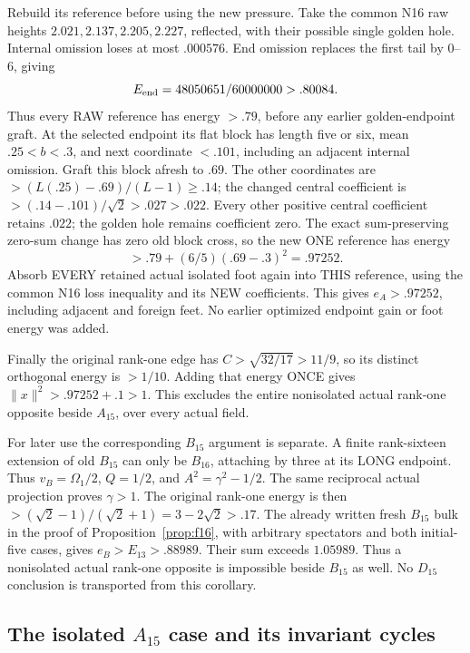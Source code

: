 \documentclass[11pt]{article}
\begin{document}
Rebuild its reference before using the new pressure.
Take the common N16 raw heights
\(2.021,2.137,2.205,2.227\), reflected,
with their possible single golden hole.
Internal omission loses at most \(.000576\).
End omission replaces the first tail by \(0\)--\(6\), giving
\[
                         E_{\rm end}=48050651/60000000>.80084 .
\]
Thus every RAW reference has energy \(>.79\), before any
earlier golden-endpoint graft.
At the selected endpoint its flat block has length five or six,
mean \(.25<b<.3\), and next coordinate \(<.101\), including
an adjacent internal omission.
Graft this block afresh to \(.69\).
The other coordinates are \(>(L(.25)-.69)/(L-1)\ge.14\);
the changed central coefficient is
\(>(.14-.101)/\sqrt2>.027>.022\).
Every other positive central coefficient retains \(.022\);
the golden hole remains coefficient zero.
The exact sum-preserving zero-sum change has zero old block cross,
so the new ONE reference has energy
\[
                    >.79+(6/5)(.69-.3)^2=.97252 .
\]
Absorb EVERY retained actual isolated foot again into THIS
reference, using the common N16 loss inequality and its NEW
coefficients.
This gives \(e_A>.97252\), including adjacent and foreign feet.
No earlier optimized endpoint gain or foot energy was added.

Finally the original rank-one edge has
\(C>\sqrt{32/17}>11/9\), so its distinct orthogonal energy is
\(>1/10\).
Adding that energy ONCE gives
\(\|x\|^2>.97252+.1>1\).
This excludes the entire nonisolated actual rank-one opposite
beside \(A_{15}\), over every actual field.

For later use the corresponding \(B_{15}\) argument is separate.
A finite rank-sixteen extension of old \(B_{15}\) can only be
\(B_{16}\), attaching by three at its LONG endpoint.
Thus \(v_B=\Omega_1/2\), \(Q=1/2\), and
\(A^2=\gamma^2-1/2\).
The same reciprocal actual projection proves \(\gamma>1\).
The original rank-one energy is then
\(>(\sqrt2-1)/(\sqrt2+1)=3-2\sqrt2>.17\).
The already written fresh \(B_{15}\) bulk in the proof of
Proposition~\ref{prop:f16}, with arbitrary spectators and both
initial-five cases, gives \(e_B>E_{13}>.88989\).
Their sum exceeds \(1.05989\).
Thus a nonisolated actual rank-one opposite is impossible
beside \(B_{15}\) as well.  No \(D_{15}\) conclusion is
transported from this corollary.

\subsection[The isolated A15 case and its invariant cycles]{The isolated \(A_{15}\) case and its invariant cycles}
\label{app:arithA15isolatedcycles}
\end{document}

